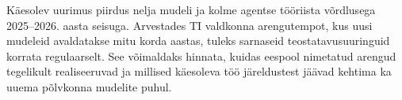Käesolev uurimus piirdus nelja mudeli ja kolme agentse tööriista võrdlusega 2025--2026. aasta seisuga. Arvestades TI valdkonna arengutempot, kus uusi mudeleid avaldatakse mitu korda aastas, tuleks sarnaseid teostatavusuuringuid korrata regulaarselt. See võimaldaks hinnata, kuidas eespool nimetatud arengud tegelikult realiseeruvad ja millised käesoleva töö järeldustest jäävad kehtima ka uuema põlvkonna mudelite puhul.

